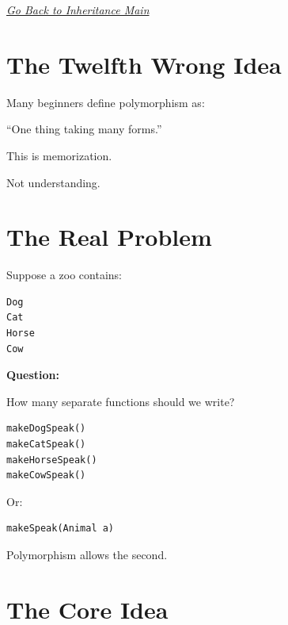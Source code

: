 \documentclass[11pt,a4paper]{book}
\begin{document}
\smallskip
\noindent
\hyperref[chap:inheritance]{\emph{Go Back to Inheritance Main}}


\section{The Twelfth Wrong Idea}

\begin{trap}

Many beginners define polymorphism as:

``One thing taking many forms.''

This is memorization.

Not understanding.

\end{trap}


\section{The Real Problem}

Suppose a zoo contains:

\begin{verbatim}
Dog
Cat
Horse
Cow
\end{verbatim}


\textbf{\textbf{Question:}}

How many separate functions should we write?

\begin{verbatim}
makeDogSpeak()
makeCatSpeak()
makeHorseSpeak()
makeCowSpeak()
\end{verbatim}


Or:

\begin{verbatim}
makeSpeak(Animal a)
\end{verbatim}


Polymorphism allows the second.


\section{The Core Idea}
\end{document}
